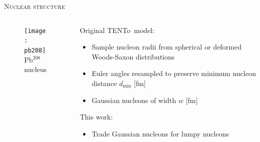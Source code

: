 \documentclass[aspectratio=169]{beamer}
\newcommand{\trento}{T\raisebox{-0.3ex}{R}ENTo}
\begin{document}
\begin{frame}[t]{\scshape Nuclear structure}
  \begin{columns}[T]
    \begin{column}{.4\textwidth}
      \begin{figure}
        \texttt{[image: pb208]}\\
        Pb$^{208}$ nucleus
      \end{figure}
    \end{column}
    \begin{column}{.6\textwidth}
      \bigskip
      \textcolor{theme}{Original \trento\ model:}
      \begin{itemize}
        \item Sample nucleon radii from spherical or deformed Woods-Saxon distributions
        \item Euler angles resampled to preserve minimum nucleon distance
          $d_\mathrm{min}$ [fm]
        \item Gaussian nucleons of width $w$ [fm]
      \end{itemize}
      \medskip
      \textcolor{theme}{This work:}
      \begin{itemize}
        \item Trade Gaussian nucleons for lumpy nucleons
      \end{itemize}
    \end{column}
  \end{columns}
\end{frame}
\end{document}
